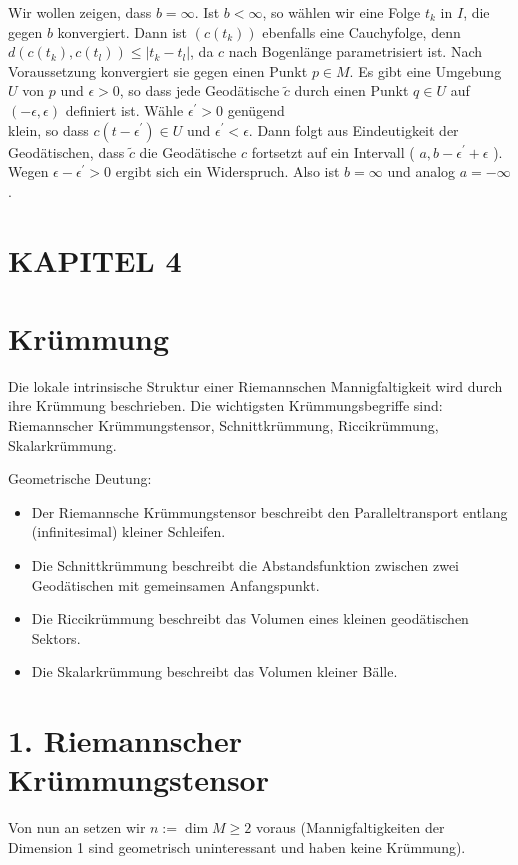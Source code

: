 \documentclass[10pt]{article}
\begin{document}
Wir wollen zeigen, dass $b=\infty$. Ist $b<\infty$, so wählen wir eine Folge $t_{k}$ in $I$, die gegen $b$ konvergiert. Dann ist $\left(c\left(t_{k}\right)\right)$ ebenfalls eine Cauchyfolge, denn $d\left(c\left(t_{k}\right), c\left(t_{l}\right)\right) \leq\left|t_{k}-t_{l}\right|$, da $c$ nach Bogenlänge parametrisiert ist. Nach Voraussetzung konvergiert sie gegen einen Punkt $p \in M$. Es gibt eine Umgebung $U$ von $p$ und $\epsilon>0$, so dass jede Geodätische $\tilde{c}$ durch einen Punkt $q \in U$ auf $(-\epsilon, \epsilon)$ definiert ist. Wähle $\epsilon^{\prime}>0$ genügend\\
klein, so dass $c\left(t-\epsilon^{\prime}\right) \in U$ und $\epsilon^{\prime}<\epsilon$. Dann folgt aus Eindeutigkeit der Geodätischen, dass $\tilde{c}$ die Geodätische $c$ fortsetzt auf ein Intervall ( $a, b-\epsilon^{\prime}+\epsilon$ ). Wegen $\epsilon-\epsilon^{\prime}>0$ ergibt sich ein Widerspruch. Also ist $b=\infty$ und analog $a=-\infty$.

\section*{KAPITEL 4}
\section*{Krümmung}
Die lokale intrinsische Struktur einer Riemannschen Mannigfaltigkeit wird durch ihre Krümmung beschrieben. Die wichtigsten Krümmungsbegriffe sind: Riemannscher Krümmungstensor, Schnittkrümmung, Riccikrümmung, Skalarkrümmung.

Geometrische Deutung:

\begin{itemize}
  \item Der Riemannsche Krümmungstensor beschreibt den Paralleltransport entlang (infinitesimal) kleiner Schleifen.
  \item Die Schnittkrümmung beschreibt die Abstandsfunktion zwischen zwei Geodätischen mit gemeinsamen Anfangspunkt.
  \item Die Riccikrümmung beschreibt das Volumen eines kleinen geodätischen Sektors.
  \item Die Skalarkrümmung beschreibt das Volumen kleiner Bälle.
\end{itemize}

\section*{1. Riemannscher Krümmungstensor}
Von nun an setzen wir $n:=\operatorname{dim} M \geq 2$ voraus (Mannigfaltigkeiten der Dimension 1 sind geometrisch uninteressant und haben keine Krümmung).
\end{document}
